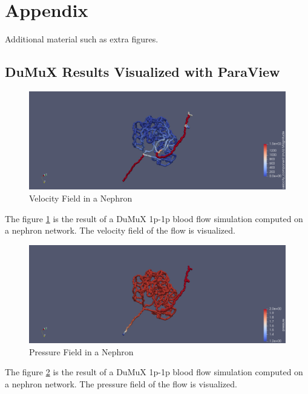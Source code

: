 
\section{Appendix}
\label{s:Appendix}

Additional material such as extra figures.
\subsection{DuMuX Results Visualized with ParaView}
\begin{figure}[h]
\centering
\includegraphics[width=162mm]{nephron_velocity}
\caption{Velocity Field in a Nephron}
\label{fig:nephron_velocity}
\end{figure}
The figure \ref{fig:nephron_velocity} is the result of a DuMuX 1p-1p blood flow simulation computed on a nephron network. The velocity field of the flow is visualized.\\

\begin{figure}[h]
\centering
\includegraphics[width=162mm]{nephron_pressure}
\caption{Pressure Field in a Nephron}
\label{fig:nephron_pressure}
\end{figure}
The figure \ref{fig:nephron_pressure} is the result of a DuMuX 1p-1p blood flow simulation computed on a nephron network. The pressure field of the flow is visualized.\\

